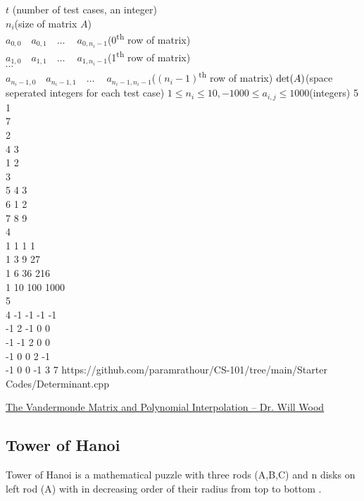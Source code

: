 \begin{testcases}
	{$t$ \hfill(number of test cases, an integer)\\$n_i$\hfill(size of matrix $A$)\\$a_{0,0}\quad a_{0,1}\quad \ldots \quad\ a_{0,n_i-1}$\quad\hfill(0\textsuperscript{th} row of matrix)\\$a_{1,0}\quad a_{1,1}\quad \ldots \quad\ a_{1,n_i-1}$\quad \hfill(1\textsuperscript{th} row of matrix)\\$\cdots$\\$a_{n_i-1,0}\quad a_{n_i-1,1}\quad \ldots \quad\ a_{n_i-1,n_i-1}$\hfill($(n_i-1)$\textsuperscript{th} row of matrix)}
	{$\operatorname{det}(A)$\hfill(space seperated integers for each test case)}
	{$1\leq n_i \leq 10, -1000\leq a_{i,j}\leq 1000$\hfill(integers)}
	{5\\1\\7\\2\\4 3\\1 2\\3\\5 4 3\\6 1 2\\7 8 9\\4\\1 1 1 1\\1 3 9 27\\1 6 36 216\\1 10 100 1000\\5\\4 -1 -1 -1 -1\\-1 2 -1 0 0\\-1 -1 2 0 0 \\-1 0 0 2 -1\\-1 0 0 -1 3}
	{7}
	{https://github.com/paramrathour/CS-101/tree/main/Starter Codes/Determinant.cpp}
\end{testcases}
\begin{funvideo}
	\href{https://youtu.be/Cov_kLatdlc}{The Vandermonde Matrix and Polynomial Interpolation -- Dr. Will Wood}
\end{funvideo}
\recalctypearea
\subsection{Tower of Hanoi}
Tower of Hanoi is a mathematical puzzle with three rods (A,B,C) and n disks on left rod (A) with in decreasing
order of their radius from top to bottom .

